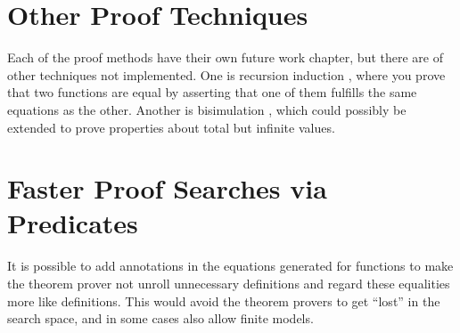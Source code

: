\section{Other Proof Techniques}

Each of the proof methods have their own future work chapter, but
there are of other techniques not implemented. One is recursion
induction \cite{recind}, where you prove that two functions are equal
by asserting that one of them fulfills the same equations as the
other. Another is bisimulation \cite{bisimulationCapretta}, which
could possibly be extended to prove properties about total but
infinite values.

\section{Faster Proof Searches via Predicates}

It is possible to add annotations in the equations generated for
functions to make the theorem prover not unroll unnecessary
definitions and regard these equalities more like definitions. This
would avoid the theorem provers to get ``lost'' in the search space,
and in some cases also allow finite models.
